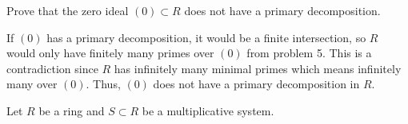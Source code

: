 \documentclass[12pt, letterpaper]{article}
\begin{document}
\begin{subproblem}{}
    Prove that the zero ideal $(0) \subset R$ does not have a primary decomposition.
\end{subproblem}
\begin{problemproof}
    If $(0)$ has a primary decomposition, it would be a finite intersection, so $R$ would only have finitely many primes over $(0)$ from problem 5. This is a contradiction since $R$ has infinitely many minimal primes which means infinitely many over $(0)$. Thus, $(0)$ does not have a primary decomposition in $R$.
\end{problemproof}

\begin{problem}{}
    Let $R$ be a ring and $S\subset R$ be a multiplicative system.
\end{problem}
\end{document}
